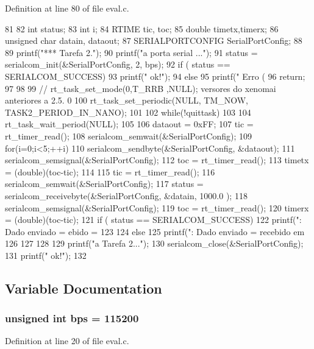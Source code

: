 Definition at line 80 of file eval.c.


\begin{DoxyCode}
81 {
82         int status;
83         int i;
84         RTIME tic, toc;
85         double timetx,timerx;
86         unsigned char datain, dataout;
87         SERIALPORTCONFIG SerialPortConfig; 
88 
89         printf("\n**** Tarefa 2.");
90         printf("\nIniciando a porta serial ...");
91         status = serialcom_init(&SerialPortConfig, 2, bps);
92         if ( status ==  SERIALCOM_SUCCESS){
93                 printf(" ok!");
94         } else {
95                 printf(" Erro (%
96                 return;
97         }
98 
99         // rt_task_set_mode(0,T_RRB ,NULL); versores do xenomai anteriores a 2.5.
      0
100         rt_task_set_periodic(NULL, TM_NOW, TASK2_PERIOD_IN_NANO);
101 
102         while(!quittask)
103         {       
104                 rt_task_wait_period(NULL);
105 
106                 dataout = 0xFF;
107                 tic = rt_timer_read();
108                 serialcom_semwait(&SerialPortConfig);
109                 for(i=0;i<5;++i)
110                         serialcom_sendbyte(&SerialPortConfig, &dataout);
111                 serialcom_semsignal(&SerialPortConfig);
112                 toc = rt_timer_read();
113                 timetx = (double)(toc-tic);
114 
115                 tic = rt_timer_read();
116                 serialcom_semwait(&SerialPortConfig);
117                 status = serialcom_receivebyte(&SerialPortConfig, &datain, 1000.0
      );
118                 serialcom_semsignal(&SerialPortConfig);
119                 toc = rt_timer_read();
120                 timerx = (double)(toc-tic);
121                 if ( status == SERIALCOM_SUCCESS){
122                         printf(": Dado enviado = %
      ebido = %
123                 }
124                 else{
125                         printf(": Dado enviado = %
       recebido em %
126                 }
127         }
128 
129         printf("\nEncerrando a Tarefa 2...");
130         serialcom_close(&SerialPortConfig);
131         printf(" ok!");
132 }
\end{DoxyCode}


\subsection{Variable Documentation}
\subsubsection[{bps}]{\setlength{\rightskip}{0pt plus 5cm}unsigned int {\bf bps} = 115200}\label{eval_8c_a97a44630a14c03d5b1a2f16ccf771a79}


Definition at line 20 of file eval.c.